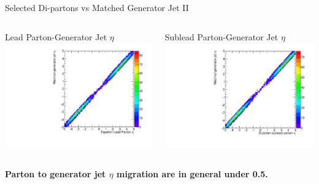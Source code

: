 \documentclass[8pt]{beamer}
\begin{document}
\begin{frame}{Selected Di-partons vs Matched Generator Jet II}

\begin{columns}

  \centering

  \begin{block}{Lead Parton-Generator Jet $\eta$}
    \centering
    \includegraphics[width=0.8\linewidth]{img/SelDiParton_MatchedGenJet_Parton1_Eta.pdf}
  \end{block}
  
  \centering
 
  \begin{block}{Sublead Parton-Generator Jet $\eta$}
    \centering
    \includegraphics[width=0.8\linewidth]{img/SelDiParton_MatchedGenJet_Parton2_Eta.pdf}
  \end{block}

\end{columns}

\begin{center}
\textbf{Parton to generator jet $\eta$ migration are in general under 0.5.}
\end{center}

\end{frame}
\end{document}
